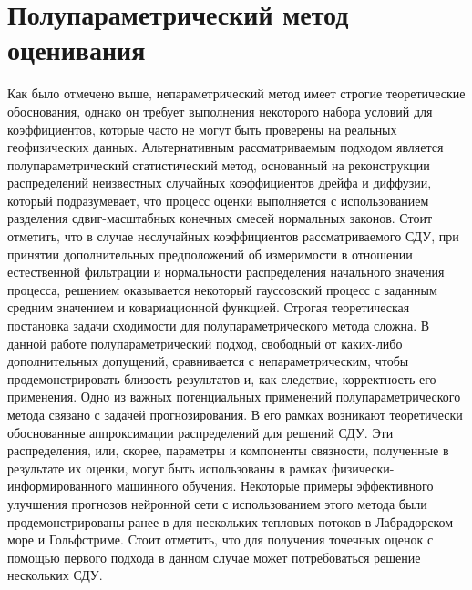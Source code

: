 \section{Полупараметрический метод оценивания}
\label{sec:Semiparametric}
Как было отмечено выше, непараметрический метод имеет строгие теоретические обоснования, однако он требует выполнения некоторого набора условий для коэффициентов, которые часто не могут быть проверены на реальных геофизических данных. Альтернативным рассматриваемым подходом является полупараметрический статистический метод, основанный на реконструкции распределений неизвестных случайных коэффициентов дрейфа и диффузии, который подразумевает, что процесс оценки выполняется с использованием разделения сдвиг-масштабных конечных смесей нормальных законов. Стоит отметить, что в случае неслучайных коэффициентов рассматриваемого СДУ, при принятии дополнительных предположений об измеримости в отношении естественной фильтрации и нормальности распределения начального значения процесса, решением оказывается некоторый гауссовский процесс с заданным средним значением и ковариационной функцией. Строгая теоретическая постановка задачи сходимости для полупараметрического метода сложна. В данной работе полупараметрический подход, свободный от каких-либо дополнительных допущений, сравнивается с непараметрическим, чтобы продемонстрировать близость результатов и, как следствие, корректность его применения. Одно из важных потенциальных применений полупараметрического метода связано с задачей прогнозирования. В его рамках возникают теоретически обоснованные аппроксимации распределений для решений СДУ. Эти распределения, или, скорее, параметры и компоненты связности, полученные в результате их оценки, могут быть использованы в рамках физически-информированного машинного обучения. Некоторые примеры эффективного улучшения прогнозов нейронной сети с использованием этого метода были продемонстрированы ранее в \cite{Kuzmin2022} для нескольких тепловых потоков в Лабрадорском море и Гольфстриме. Стоит отметить, что для получения точечных оценок с помощью первого подхода в данном случае может потребоваться решение нескольких СДУ.


